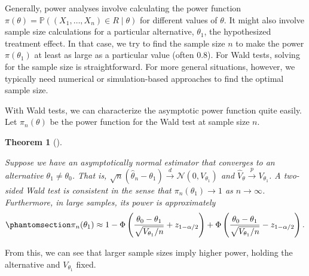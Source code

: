 \documentclass[
  13pt,
  letterpaper,
  DIV=11,
  numbers=noendperiod]{scrreprt}
\newcommand{\N}{\mathcal{N}}
\renewcommand{\P}{\mathbb{P}}
\newcommand{\inprob}{\overset{p}{\to}}
\newcommand{\indist}{\overset{d}{\to}}
\theoremstyle{plain}
\newtheorem{theorem}{Theorem}[chapter]
\theoremstyle{plain}
\theoremstyle{definition}
\theoremstyle{definition}
\theoremstyle{remark}
\begin{document}
Generally, power analyses involve calculating the power function
\(\pi(\theta) = \P((X_1, \ldots, X_n) \in R \mid \theta)\) for different
values of \(\theta\). It might also involve sample size calculations for
a particular alternative, \(\theta_1\), the hypothesized treatment
effect. In that case, we try to find the sample size \(n\) to make the
power \(\pi(\theta_1)\) at least as large as a particular value (often
0.8). For Wald tests, solving for the sample size is straightforward.
For more general situations, however, we typically need numerical or
simulation-based approaches to find the optimal sample size.

With Wald tests, we can characterize the asymptotic power function quite
easily. Let \(\pi_n(\theta)\) be the power function for the Wald test at
sample size \(n\).

\begin{theorem}[]\protect\hypertarget{thm-power}{}\label{thm-power}

Suppose we have an asymptotically normal estimator that converges to an
alternative \(\theta_1 \neq \theta_0\). That is,
\(\sqrt{n}(\widehat{\theta}_n - \theta_1) \indist \N(0, V_{\theta_1})\)
and \(\widehat{V}_\theta\inprob V_{\theta_1}\). A two-sided Wald test is
consistent in the sense that \(\pi_n(\theta_1) \to 1\) as
\(n \to \infty\). Furthermore, in large samples, its power is
approximately
\begin{equation}\protect\phantomsection\label{eq-asymptotic-power}{ 
\pi_n(\theta_1) \approx 1 - \Phi\left( \frac{\theta_0 - \theta_1}{\sqrt{V_{\theta_1}/n}} + z_{1-\alpha/2} \right) + \Phi\left( \frac{\theta_0 - \theta_1}{\sqrt{V_{\theta_1}/n}}-z_{1-\alpha/2} \right).
}\end{equation}

\end{theorem}

From this, we can see that larger sample sizes imply higher power,
holding the alternative and \(V_{\theta_1}\) fixed.
\end{document}
